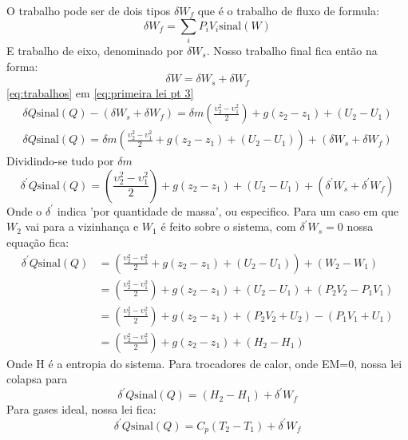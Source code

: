 O trabalho pode ser de dois tipos \(\delta W_f\) que é o trabalho de fluxo de formula:
\begin{equation}
    \delta W_f=\sum_{i} P_i V_i \text{sinal}(W) 
\end{equation}
E trabalho de eixo, denominado por \(\delta W_s\). Nosso trabalho final fica então na forma:
\begin{equation}\label{eq:trabalhos}
    \delta  W=\delta W_s + \delta W_f
\end{equation}
\eqref{eq:trabalhos} em \eqref{eq:primeira lei pt 3}
\begin{align}
    \delta Q \text{sinal}(Q)-(\delta W_s + \delta W_f)=\delta m(\frac{ \upsilon ^{2}_2-\upsilon ^{2}_1 }{2})+ g(z_{2}-z_1)  +(U_2-U_1)\\
    \delta Q \text{sinal}(Q)=\delta m(\frac{ \upsilon ^{2}_2-\upsilon ^{2}_1 }{2}+ g(z_{2}-z_1)  +(U_2-U_1))+(\delta W_s + \delta W_f)
\end{align}
Dividindo-se tudo por \(\delta m\)
\begin{equation}\label{eq:Primeira lei forma geral}
    \delta^\prime  Q \text{sinal}(Q)=(\frac{ \upsilon ^{2}_2-\upsilon ^{2}_1 }{2})+ g(z_{2}-z_1)  +(U_2-U_1)+(\delta^\prime  W_s + \delta^\prime  W_f)
\end{equation}
Onde o \(\delta ^\prime \) indica 'por quantidade de massa', ou especifico. Para um caso em que
\(W_2\) vai para a vizinhança e \(W_1\) é feito sobre o sistema, com \(\delta^\prime  W_s=0\)  nossa
equação fica:
\begin{align}\label{eq:Primeira lei para quase trocadores}
    \delta^\prime  Q \text{sinal}(Q)&=(\frac{ \upsilon ^{2}_2-\upsilon ^{2}_1 }{2}+ g(z_{2}-z_1)  +(U_2-U_1))+(W_2 - W_1)\\
    &=(\frac{ \upsilon ^{2}_2-\upsilon ^{2}_1 }{2})+ g(z_{2}-z_1)  +(U_2-U_1)+(P_2 V_2  - P_1 V_1)\\
    &=(\frac{ \upsilon ^{2}_2-\upsilon ^{2}_1 }{2})+ g(z_{2}-z_1) +(P_2 V_2 +U_2)  - (P_1 V_1 + U_1)\\
    &=(\frac{ \upsilon ^{2}_2-\upsilon ^{2}_1 }{2})+ g(z_{2}-z_1) +(H_2 - H_1)
\end{align}
Onde H é a entropia do sistema. Para trocadores de calor, onde EM=0, nossa lei colapsa para
\begin{equation}\label{eq:Primeira lei para trocadores de calor}
    \delta^\prime  Q \text{sinal}(Q)=(H_2 - H_1)+\delta^\prime W_f
\end{equation}
Para gases ideal, nossa lei fica:
\begin{equation}\label{eq:Primeira lei para gases ideais}
    \delta^\prime  Q \text{sinal}(Q)=C_p (T_2 - T_1)+\delta^\prime W_f
\end{equation}
